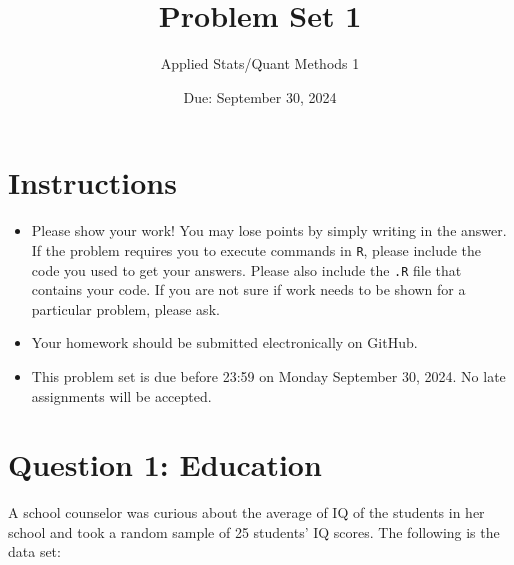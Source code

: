 \documentclass[12pt,letterpaper]{article}
\title{Problem Set 1}
\date{Due: September 30, 2024}
\author{Applied Stats/Quant Methods 1}
\begin{document}
	\maketitle
	
	\section*{Instructions}
	\begin{itemize}
		\item Please show your work! You may lose points by simply writing in the answer. If the problem requires you to execute commands in \texttt{R}, please include the code you used to get your answers. Please also include the \texttt{.R} file that contains your code. If you are not sure if work needs to be shown for a particular problem, please ask.
		\item Your homework should be submitted electronically on GitHub.
		\item This problem set is due before 23:59 on Monday September 30, 2024. No late assignments will be accepted.
	\end{itemize}
	
	\vspace{1cm}
	\section*{Question 1: Education}
	
	A school counselor was curious about the average of IQ of the students in her school and took a random sample of 25 students' IQ scores. The following is the data set:\\
	\vspace{.1cm} 
	
\end{document}
